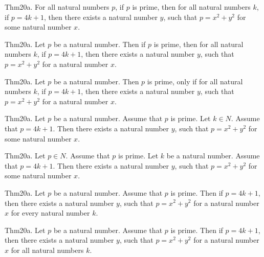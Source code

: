 \documentclass{article}
\begin{document}
Thm20a. For all natural numbers $p$, if $p$ is prime, then for all natural numbers $k$, if $p = 4 k + 1$, then there exists a natural number $y$, such that $p = x ^{ 2}+ y ^{ 2}$ for some natural number $x$.

Thm20a. Let $p$ be a natural number. Then if $p$ is prime, then for all natural numbers $k$, if $p = 4 k + 1$, then there exists a natural number $y$, such that $p = x ^{ 2}+ y ^{ 2}$ for a natural number $x$.

Thm20a. Let $p$ be a natural number. Then $p$ is prime, only if for all natural numbers $k$, if $p = 4 k + 1$, then there exists a natural number $y$, such that $p = x ^{ 2}+ y ^{ 2}$ for a natural number $x$.

Thm20a. Let $p$ be a natural number. Assume that $p$ is prime. Let $k \in N$. Assume that $p = 4 k + 1$. Then there exists a natural number $y$, such that $p = x ^{ 2}+ y ^{ 2}$ for some natural number $x$.

Thm20a. Let $p \in N$. Assume that $p$ is prime. Let $k$ be a natural number. Assume that $p = 4 k + 1$. Then there exists a natural number $y$, such that $p = x ^{ 2}+ y ^{ 2}$ for some natural number $x$.

Thm20a. Let $p$ be a natural number. Assume that $p$ is prime. Then if $p = 4 k + 1$, then there exists a natural number $y$, such that $p = x ^{ 2}+ y ^{ 2}$ for a natural number $x$ for every natural number $k$.

Thm20a. Let $p$ be a natural number. Assume that $p$ is prime. Then if $p = 4 k + 1$, then there exists a natural number $y$, such that $p = x ^{ 2}+ y ^{ 2}$ for a natural number $x$ for all natural numbers $k$.
\end{document}
